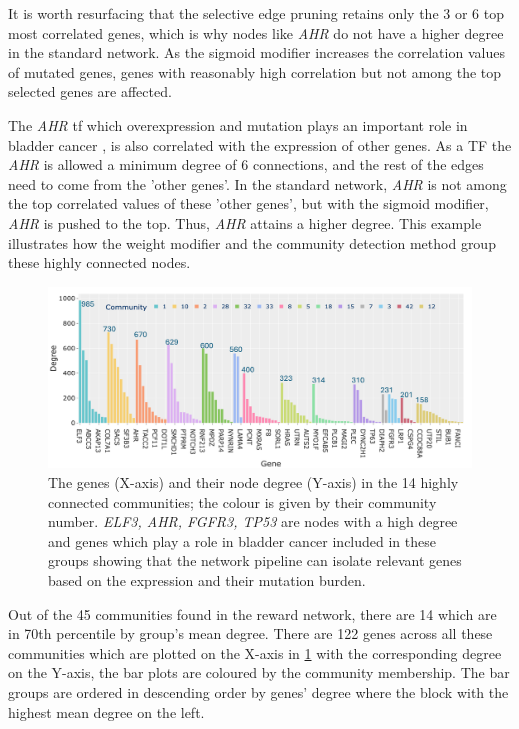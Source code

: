 It is worth resurfacing that the selective edge pruning retains only the 3 or 6 top most correlated genes, which is why nodes like \textit{AHR} do not have a higher degree in the standard network. As the sigmoid modifier increases the correlation values of mutated genes, genes with reasonably high correlation but not among the top selected genes are affected.

The \textit{AHR} \acrlong{tf} which overexpression and mutation plays an important role in bladder cancer \citep{Shi2020-km}, is also correlated with the expression of other genes. As a TF the \textit{AHR} is allowed a minimum degree of 6 connections, and the rest of the edges need to come from the 'other genes'. In the standard network, \textit{AHR} is not among the top correlated values of these 'other genes', but with the sigmoid modifier, \textit{AHR} is pushed to the top. Thus, \textit{AHR} attains a higher degree. This example illustrates how the weight modifier and the community detection method group these highly connected nodes.

\begin{figure}[!t]    
    \centering
    \includegraphics[width=1.0\textwidth,keepaspectratio]{Sections/Network_II/resources/reward/SmallCom_gene_labeled.png}
    \caption[Degree values of the highly connected genes]{The genes (X-axis) and their node degree (Y-axis) in the 14 highly connected communities; the colour is given by their community number. \textit{ELF3, AHR, FGFR3, TP53} are nodes with a high degree and genes which play a role in bladder cancer \citep{Robertson2017-mg} included in these groups showing that the network pipeline can isolate relevant genes based on the expression and their mutation burden.}
    \label{fig:N_II:genes_highConn}
\end{figure}


Out of the 45 communities found in the reward network, there are 14 which are in 70th percentile by group's mean degree. There are 122 genes across all these communities which are plotted on the X-axis in \cref{fig:N_II:genes_highConn} with the corresponding degree on the Y-axis, the bar plots are coloured by the community membership. The bar groups are ordered in descending order by genes' degree where the block with the highest mean degree on the left.


